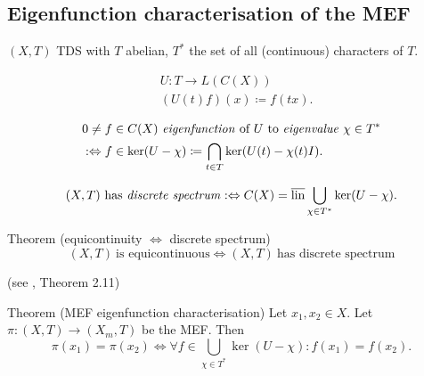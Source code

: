 \subsection{Eigenfunction characterisation of the MEF}
\begin{frame}
  $(X,T)$ TDS with $T$ abelian, $T^*$ the set of all (continuous) characters of $T$.
\begin{definition}
  \begin{equation*}
    \begin{split}
      &U : T \longrightarrow L(C(X)) \\
      &(U(t) f)(x) \coloneq f(tx).
    \end{split}
  \end{equation*}
   \end{definition}
   \pause
   \begin{definition}
   \begin{equation*}
    \begin{split}
      &0 \neq f \in C(X) \ \text{\emph{eigenfunction} of} \ U \ \text{to \emph{eigenvalue}} \ \chi \in T^*   \\
 &:\Leftrightarrow f \in \ker (U-\chi)\coloneq \bigcap_{t \in T} \ker (U(t)- \chi (t)I).
    \end{split}
      \end{equation*}
   \end{definition}
\end{frame}
\begin{frame}[fragile]
 \begin{definition}
  \begin{equation*}
    (X,T) \ \text{has \emph{discrete spectrum}}:\Leftrightarrow C(X) = \overline{\operatorname{lin}} \bigcup_{\chi \in T^*} \ker (U- \chi).
  \end{equation*}
\end{definition}
\pause 
  \begin{alertblock}{Theorem (equicontinuity $\Leftrightarrow$ discrete spectrum)}%
  \begin{equation*}
    (X,T) \ \text{is equicontinuous} \Leftrightarrow (X,T) \ \text{has discrete spectrum}
  \end{equation*}

    \hfill(see \cite{HK2023}, Theorem 2.11)
\end{alertblock}
\pause
  \begin{alertblock}{Theorem (MEF eigenfunction characterisation)}
  \label{thm:MEF_EFchar}
  Let $x_1,x_2 \in X$. Let $\pi : (X,T) \to (X_m,T)$ be the MEF.
  Then
  \begin{equation*}
  \pi (x_1) = \pi (x_2) \Leftrightarrow 
    \forall f \in \bigcup_{\chi \in T^*} \ker (U- \chi) : f(x_1) = f(x_2).
  \end{equation*}
\end{alertblock}
\end{frame}
